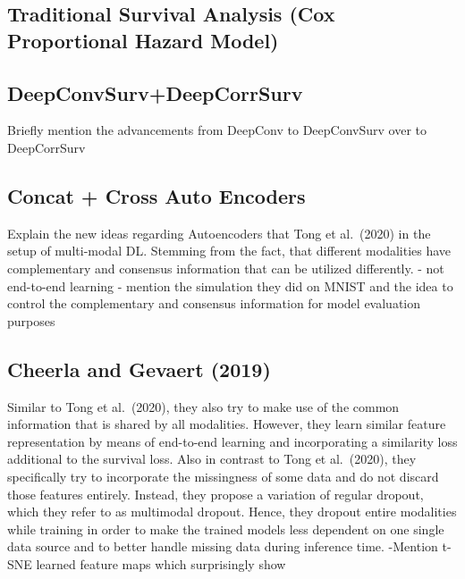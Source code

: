 \documentclass[
]{krantz}
\begin{document}
\hypertarget{traditional-survival-analysis-cox-proportional-hazard-model}{%
\subsection{Traditional Survival Analysis (Cox Proportional Hazard Model)}\label{traditional-survival-analysis-cox-proportional-hazard-model}}

\hypertarget{deepconvsurvdeepcorrsurv}{%
\subsection{DeepConvSurv+DeepCorrSurv}\label{deepconvsurvdeepcorrsurv}}

Briefly mention the advancements from DeepConv to DeepConvSurv over to DeepCorrSurv

\hypertarget{concat-cross-auto-encoders}{%
\subsection{Concat + Cross Auto Encoders}\label{concat-cross-auto-encoders}}

Explain the new ideas regarding Autoencoders that Tong et al.~(2020) in the setup of multi-modal DL. Stemming from the fact, that different modalities have complementary and consensus information that can be utilized differently.
- not end-to-end learning
- mention the simulation they did on MNIST and the idea to control the complementary and consensus information for model evaluation purposes

\hypertarget{cheerla-and-gevaert-2019}{%
\subsection{Cheerla and Gevaert (2019)}\label{cheerla-and-gevaert-2019}}

Similar to Tong et al.~(2020), they also try to make use of the common information that is shared by all modalities. However, they learn similar feature representation by means of end-to-end learning and incorporating a similarity loss additional to the survival loss. Also in contrast to Tong et al.~(2020), they specifically try to incorporate the missingness of some data and do not discard those features entirely. Instead, they propose a variation of regular dropout, which they refer to as multimodal dropout. Hence, they dropout entire modalities while training in order to make the trained models less dependent on one single data source and to better handle missing data during inference time.
-Mention t-SNE learned feature maps which surprisingly show
\end{document}
